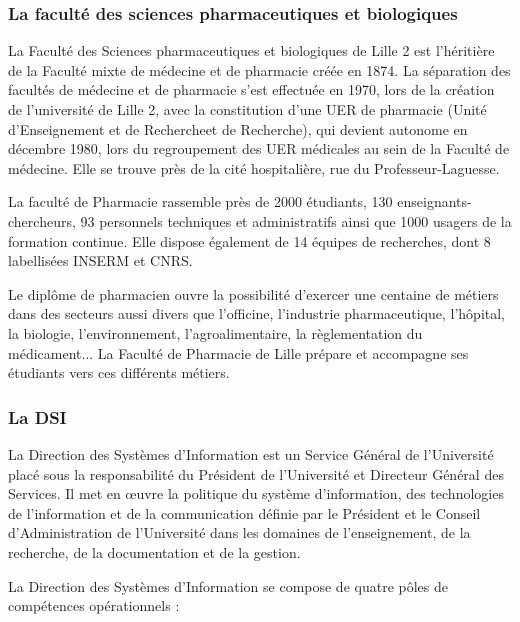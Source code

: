 \documentclass[11pt, a4paper, twoside]{report}
\begin{document}
\subsubsection{La faculté des sciences pharmaceutiques et biologiques}

La Faculté des Sciences pharmaceutiques et biologiques de Lille 2 est l'héritière de la Faculté mixte de médecine et de pharmacie créée en 1874. La séparation des facultés de médecine et de pharmacie s'est effectuée en 1970, lors de la création de l'université de Lille 2, avec la constitution d'une UER de pharmacie (Unité d'Enseignement et de Rechercheet de Recherche), qui devient autonome en décembre 1980, lors du regroupement des UER médicales au sein de la Faculté de médecine. Elle se trouve près de la cité hospitalière, rue du Professeur-Laguesse.

La faculté de Pharmacie rassemble près de 2000 étudiants, 130 enseignants-chercheurs, 93 personnels techniques et administratifs ainsi que 1000 usagers de la formation continue. Elle dispose également de 14 équipes de recherches, dont 8 labellisées INSERM et CNRS.

Le diplôme de pharmacien ouvre la possibilité d'exercer une centaine de métiers dans des secteurs aussi divers que l'officine, l'industrie pharmaceutique, l'hôpital, la biologie, l'environnement, l'agroalimentaire, la règlementation du médicament... La Faculté de Pharmacie de Lille prépare et accompagne ses étudiants vers ces différents métiers. 

\subsubsection{La DSI}
La Direction des Systèmes d'Information est un Service Général de l'Université placé sous la responsabilité du Président de l'Université et Directeur Général des Services. Il met en œuvre la politique du système d'information, des technologies de l'information et de la communication définie par le Président et le Conseil d'Administration de l'Université dans les domaines de l'enseignement, de la recherche, de la documentation et de la gestion.

La Direction des Systèmes d'Information se compose de quatre pôles de compétences opérationnels :
\end{document}
